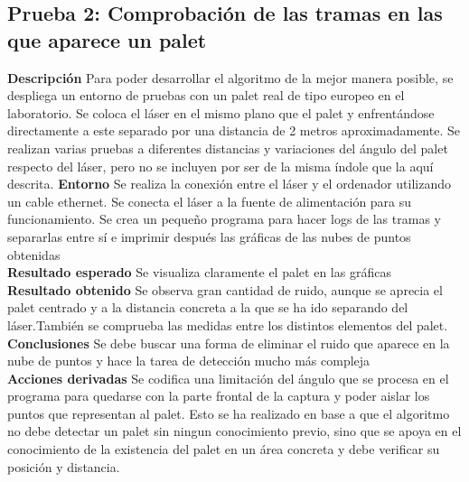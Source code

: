 \subsection{Prueba 2: Comprobación de las tramas en las que aparece un palet}
\textbf{Descripción} Para poder desarrollar el algoritmo de la mejor manera posible, se despliega un entorno de pruebas con un palet real de tipo europeo en el laboratorio. Se coloca el láser en el mismo plano que el palet y enfrentándose directamente a este separado por una distancia de 2 metros aproximadamente. Se realizan varias pruebas a diferentes distancias y variaciones del ángulo del palet respecto del láser, pero no se incluyen por ser de la misma  índole que la aquí descrita.
\textbf{Entorno} Se realiza la conexión entre el láser y el ordenador utilizando un cable ethernet. Se conecta el láser a la fuente de alimentación para su funcionamiento. Se crea un pequeño programa para hacer logs de las tramas y separarlas entre sí e imprimir después las gráficas de las nubes de puntos obtenidas\\
\textbf{Resultado esperado} Se visualiza claramente el palet en las gráficas\\
\textbf{Resultado obtenido} Se observa gran cantidad de ruido, aunque se aprecia el palet centrado y a la distancia concreta a la que se ha ido separando del láser.También se comprueba las medidas entre los distintos elementos del palet.\\
\textbf{Conclusiones} Se debe buscar una forma de eliminar el ruido que aparece en la nube de puntos y hace la tarea de detección mucho más compleja\\
\textbf{Acciones derivadas} Se codifica una limitación del ángulo que se procesa en el programa para quedarse con la parte frontal de la captura y poder aislar los puntos que representan al palet. Esto se ha realizado en base a que el algoritmo no debe detectar un palet sin ningun conocimiento previo, sino que se apoya en el conocimiento de la existencia del palet en un área concreta y debe verificar su posición y distancia.